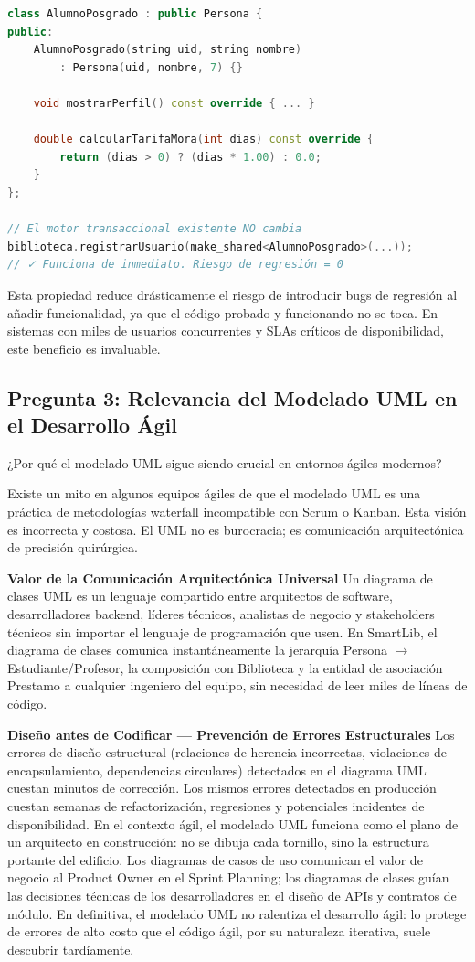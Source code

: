 \documentclass[12pt,a4paper]{article}
\begin{document}
\begin{lstlisting}[language=C++]
class AlumnoPosgrado : public Persona {
public:
    AlumnoPosgrado(string uid, string nombre)
        : Persona(uid, nombre, 7) {}

    void mostrarPerfil() const override { ... }

    double calcularTarifaMora(int dias) const override {
        return (dias > 0) ? (dias * 1.00) : 0.0;
    }
};

// El motor transaccional existente NO cambia
biblioteca.registrarUsuario(make_shared<AlumnoPosgrado>(...));
// ✓ Funciona de inmediato. Riesgo de regresión = 0
\end{lstlisting}

Esta propiedad reduce drásticamente el riesgo de introducir bugs de regresión al añadir funcionalidad, ya que el código probado y funcionando no se toca. En sistemas con miles de usuarios concurrentes y SLAs críticos de disponibilidad, este beneficio es invaluable.

\subsection{Pregunta 3: Relevancia del Modelado UML en el Desarrollo Ágil}
¿Por qué el modelado UML sigue siendo crucial en entornos ágiles modernos?

Existe un mito en algunos equipos ágiles de que el modelado UML es una práctica de metodologías waterfall incompatible con Scrum o Kanban. Esta visión es incorrecta y costosa. El UML no es burocracia; es comunicación arquitectónica de precisión quirúrgica.

\textbf{Valor de la Comunicación Arquitectónica Universal}
Un diagrama de clases UML es un lenguaje compartido entre arquitectos de software, desarrolladores backend, líderes técnicos, analistas de negocio y stakeholders técnicos sin importar el lenguaje de programación que usen. En SmartLib, el diagrama de clases comunica instantáneamente la jerarquía Persona $\rightarrow$ Estudiante/Profesor, la composición con Biblioteca y la entidad de asociación Prestamo a cualquier ingeniero del equipo, sin necesidad de leer miles de líneas de código.

\textbf{Diseño antes de Codificar — Prevención de Errores Estructurales}
Los errores de diseño estructural (relaciones de herencia incorrectas, violaciones de encapsulamiento, dependencias circulares) detectados en el diagrama UML cuestan minutos de corrección. Los mismos errores detectados en producción cuestan semanas de refactorización, regresiones y potenciales incidentes de disponibilidad. En el contexto ágil, el modelado UML funciona como el plano de un arquitecto en construcción: no se dibuja cada tornillo, sino la estructura portante del edificio. Los diagramas de casos de uso comunican el valor de negocio al Product Owner en el Sprint Planning; los diagramas de clases guían las decisiones técnicas de los desarrolladores en el diseño de APIs y contratos de módulo. En definitiva, el modelado UML no ralentiza el desarrollo ágil: lo protege de errores de alto costo que el código ágil, por su naturaleza iterativa, suele descubrir tardíamente.
\end{document}
